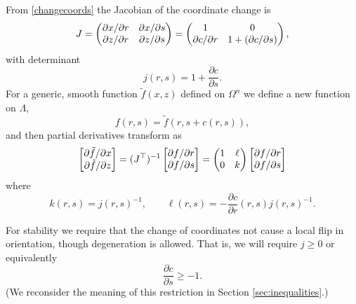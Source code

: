\documentclass[letterpaper,final,12pt,reqno]{amsart}
\begin{document}
From \eqref{changecoords} the Jacobian of the coordinate change is
\begin{equation}
J = \begin{pmatrix} \partial x / \partial r & \partial x / \partial s \\ \strut \partial z / \partial r & \partial z / \partial s \end{pmatrix} = \begin{pmatrix} 1 & 0 \\ \partial c/\partial r & 1+(\partial c/\partial s) \end{pmatrix}, \label{jacchange}
\end{equation}
with determinant
\begin{equation}
j(r,s) = 1+\frac{\partial c}{\partial s}. \label{definej}
\end{equation}
For a generic, smooth function $\tilde f(x,z)$ defined on $\Omega^n$ we define a new function on $\Lambda$,
    $$f(r,s) = \tilde f(r,s+c(r,s)),$$
and then partial derivatives transform as
\begin{equation}
\begin{bmatrix} \partial \tilde f / \partial x \\ \strut \partial \tilde f / \partial z\end{bmatrix} = (J^\top)^{-1} \begin{bmatrix} \partial f / \partial r \\ \strut \partial f / \partial s\end{bmatrix} = \begin{pmatrix} 1 & \ell \\ 0 & k \end{pmatrix} \begin{bmatrix} \partial f / \partial r \\ \strut \partial f / \partial s\end{bmatrix} \label{changederivatives}
\end{equation}
where
\begin{equation}
k(r,s) = j(r,s)^{-1}, \qquad \ell(r,s) = - \frac{\partial c}{\partial r}(r,s) j(r,s)^{-1}. \label{definejkl}
\end{equation}

For stability we require that the change of coordinates not cause a local flip in orientation, though degeneration is allowed.  That is, we will require $j\ge 0$ or equivalently
\begin{equation}
\frac{\partial c}{\partial s} \ge -1. \label{differentialVI}
\end{equation}
(We reconsider the meaning of this restriction in Section \ref{sec:inequalities}.)
\end{document}
